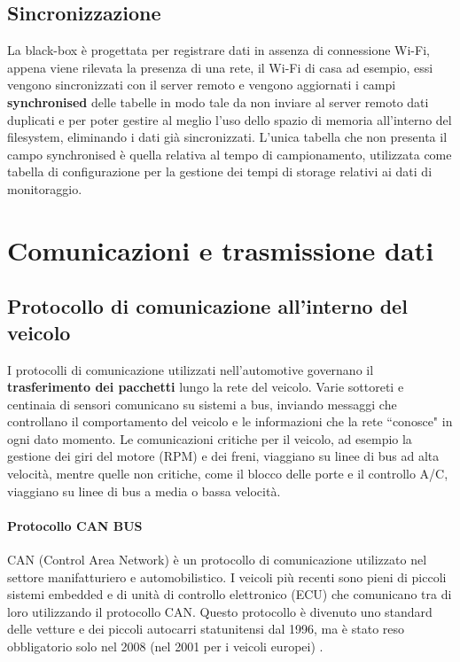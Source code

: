 \documentclass[12pt, a4paper, italian]{report}
\numberwithin{figure}{chapter}
\numberwithin{table}{chapter}
\begin{document}
\subsection{Sincronizzazione}
\label{sec:Sincronizzazione}
La black-box è progettata per registrare dati in assenza di connessione Wi-Fi, appena viene rilevata la presenza di una rete, il Wi-Fi di casa ad esempio, essi vengono sincronizzati con il server remoto e vengono aggiornati i campi \textbf{synchronised} delle tabelle in modo tale da non inviare al server remoto dati duplicati e per poter gestire al meglio l'uso dello spazio di memoria all'interno del filesystem, eliminando i dati già sincronizzati. 
L'unica tabella che non presenta il campo synchronised è quella relativa al tempo di campionamento, utilizzata come tabella di configurazione per la gestione dei tempi di storage relativi ai dati di monitoraggio.

\section{Comunicazioni e trasmissione dati}
\subsection{Protocollo di comunicazione all'interno del veicolo}
I protocolli di comunicazione utilizzati nell'automotive governano il \textbf{trasferimento dei pacchetti} lungo la rete del veicolo. Varie sottoreti e centinaia di sensori comunicano su sistemi a bus, inviando messaggi che controllano il comportamento del veicolo e le informazioni che la rete ``conosce" in ogni dato momento.
Le comunicazioni critiche per il veicolo, ad esempio la gestione dei giri del motore (RPM) e dei freni, viaggiano su linee di bus ad alta velocità, mentre quelle non critiche, come il blocco delle porte e il controllo A/C, viaggiano su linee di bus a media o bassa velocità.
\paragraph{Protocollo CAN BUS} CAN (Control Area Network) è un protocollo di comunicazione utilizzato nel settore manifatturiero e automobilistico. I veicoli più recenti sono pieni di piccoli sistemi embedded e di unità di controllo elettronico (ECU) che comunicano tra di loro utilizzando il protocollo CAN. Questo protocollo è divenuto uno standard delle vetture e dei piccoli autocarri statunitensi dal 1996, ma è stato reso obbligatorio solo nel 2008 (nel 2001 per i veicoli europei) \cite{manualeHacker}. 
\end{document}
